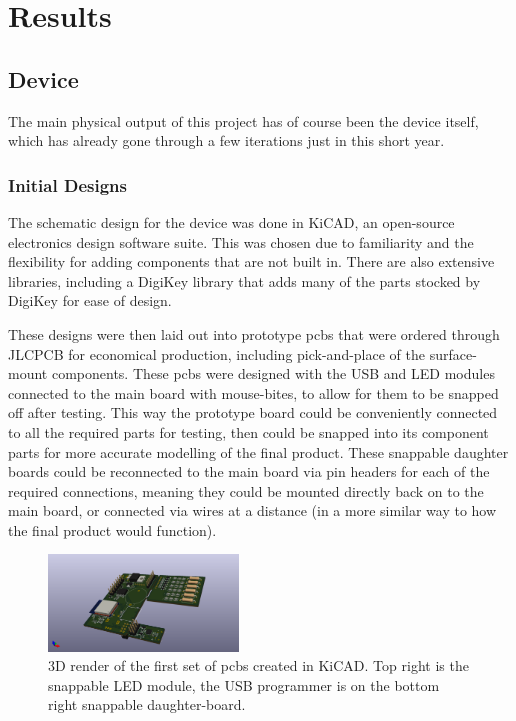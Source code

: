 


\chapter{Results}
\label{Sec:physicalOuts}

\section{Device}

The main physical output of this project has of course been the device itself, which has already gone through a few iterations just in this short year.

\subsection{Initial Designs}

The schematic design for the device was done in KiCAD, an open-source electronics design software suite. This was chosen due to familiarity and the flexibility for adding components that are not built in. There are also extensive libraries, including a DigiKey library that adds many of the parts stocked by DigiKey for ease of design.

These designs were then laid out into prototype \acrshort{pcbs} that were ordered through JLCPCB for economical production, including pick-and-place of the surface-mount components. These \acrshort{pcbs} were designed with the USB and LED modules connected to the main board with mouse-bites, to allow for them to be snapped off after testing. This way the prototype board could be conveniently connected to all the required parts for testing, then could be snapped into its component parts for more accurate modelling of the final product. These snappable daughter boards could be reconnected to the main board via pin headers for each of the required connections, meaning they could be mounted directly back on to the main board, or connected via wires at a distance (in a more similar way to how the final product would function). 

\begin{figure}[bt]
\centering
\includegraphics[width=0.45\textwidth]{images/pcb3d1.png}
\caption{3D render of the first set of \acrshort{pcbs} created in KiCAD. Top right is the snappable LED module, the USB programmer is on the bottom right snappable daughter-board.}
\label{Fig:PCB1}
\end{figure}

